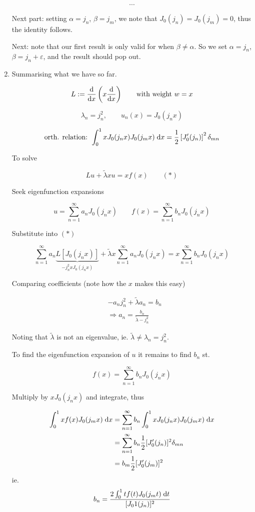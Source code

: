 \documentclass[a4paper]{article}
\begin{document}
\begin{enumerate}
\[ \cdots \]

Next part: setting $ \alpha = j_{n} $, $ \beta = j_{m} $, we note that $ J_{0}(j_{n}) = J_{0}(j_{m}) = 0 $, thus the identity follows.

Next: note that our first result is only valid for when $ \beta \neq \alpha $. So we set $ \alpha = j_{n} $, $ \beta = j_{n} + \varepsilon $, and the result should pop out.

\item Summarising what we have so far.

\[ L : = \frac{\mathrm{d} }{\mathrm{d} x} \left(  x \frac{\mathrm{d} }{\mathrm{d} x}   \right)  \qquad \text{with weight } w = x \]

\[ \lambda_{n} = j_{n}^{2}, \qquad u_{n}(x) = J_{0} (j_{n} x )   \]

\[ \text{orth. relation: } \int_{0}^{1} x J_{0}(j_{n} x) J_{0} (j_{m} x) \; \mathrm{d} x= \frac{1}{2} \left[  J_{0}'(j_{n}) \right]^{2} \delta_{mn}   \]


To solve 

\[ L u + \tilde{\lambda} x u = x f(x) \qquad (*)  \]

Seek eigenfunction expansions

\[ u = \sum_{n=1}^{\infty} a_{n} J_{0} (j_{n} x) \qquad f(x) = \sum_{n=1}^{\infty} b_{n} J_{0} (j_{n} x )   \]

Substitute into $ (*) $

\[ \sum_{n=1}^{\infty} a_{n} \underbrace{L [J_{0} (j_{n} x) ] }_{-j_{n}^{2} x J_{0}(j_{n}x) } + \tilde{\lambda}  x \sum_{n=1}^{\infty} a_{n} J_{0} (j_{n} x)  = x \sum_{n=1}^{\infty} b_{n} J_{0} (j_{n} x )    \]

Comparing coefficients (note how the $ x $ makes this easy)

\begin{align*}
& - a_{n} j_{n}^{2} + \tilde{\lambda} a_{n} = b_{n} \\
& \Rightarrow a_{n} = \frac{b_{n}}{\tilde{\lambda} - j_{n}^{2} }
\end{align*}

Noting that $ \tilde{\lambda} $ is not an eigenvalue, ie. $ \tilde{\lambda} \neq \lambda_{n} = j_{n}^{2} $.

To find the eigenfunction expansion of $ u $ it remains to find $ b_{n} $ st. 

\[ f(x) = \sum_{n=1}^{\infty} b_{n} J_{0}(j_{n}x)  \]


Multiply by $ x J_{0}(j_{n} x) $ and integrate, thus

\begin{align*}
\int_{0}^{1}  x f(x) J_{0}(j_{m} x) \; \mathrm{d} x  & =  \sum_{n=1}^{\infty} b_{n} \int_{0}^{1}  x J_{0}(j_{n} x) J_{0}(j_{m} x) \; \mathrm{d} x   \\
& = \sum_{n=1}^{\infty} b_{n} \frac{1}{2}  [  J_{0}'(j_{n}) ]^{2} \delta_{mn} \\
& = b_{m} \frac{1}{2}  [  J_{0}'(j_{m}) ]^{2} \\
\end{align*}
ie.
\[ b_{n}  = \frac{ 2 \int_{0}^{1}  t f(t) J_{0}(j_{m} t) \; \mathrm{d} t}{  [ J_{0}1(j_{n}) ]^{2} }  \]


\end{enumerate}
\end{document}
